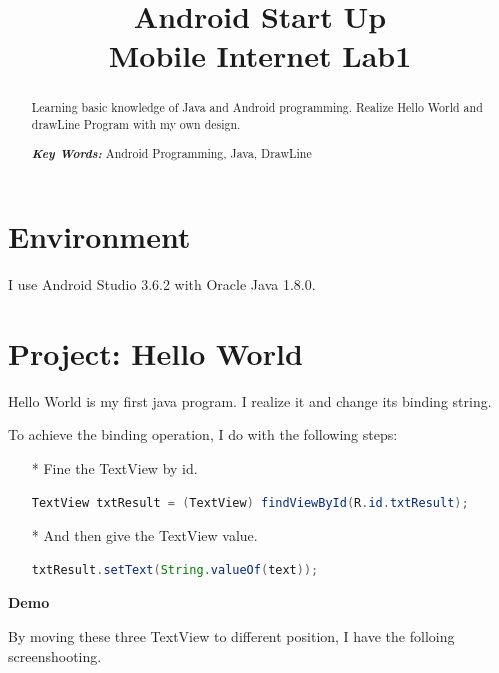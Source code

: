 \documentclass{article}
\title{\textbf{Android Start Up\\Mobile Internet Lab1}}
\begin{document}
	\maketitle
	
	\begin{abstract}
		Learning basic knowledge of Java and Android programming. Realize Hello World and drawLine Program with my own design.
		
		\textit{\textbf{Key Words:} }Android Programming, Java, DrawLine
	\end{abstract}
	
	
	\section{Environment}
	I use Android Studio 3.6.2 with Oracle Java 1.8.0.
	
	\section{Project: Hello World}
	Hello World is my first java program. I realize it and change its binding string.
	
	To achieve the binding operation, I do with the following steps:
	\begin{enumerate}
		\item[*] Fine the TextView by id.
		\begin{lstlisting}[language={java}]
TextView txtResult = (TextView) findViewById(R.id.txtResult);
		\end{lstlisting}
		
		\item[*] And then give the TextView value.
		\begin{lstlisting}[language={java}]
txtResult.setText(String.valueOf(text));
		\end{lstlisting}
		
	\end{enumerate}

	\textbf{Demo}
	
	By moving these three TextView to different position, I have the folloing screenshooting.
	
\end{document}
